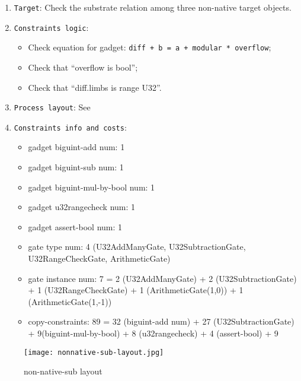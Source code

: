 
\begin{enumerate}
    \item \verb|Target|: Check the substrate relation among three non-native target objects.
    \item \verb|Constraints logic|:
    \begin{itemize}
        \item Check equation for gadget: \verb|diff + b = a + modular * overflow|;
        \item Check that ``overflow is bool'';
        \item Check that ``diff.limbs is range U32''.
    \end{itemize}
    \item \verb|Process layout|: See 
    \item \verb|Constraints info and costs|:
    \begin{itemize}
        \item gadget biguint-add num: 1
        \item gadget biguint-sub num: 1
        \item gadget biguint-mul-by-bool num: 1
        \item gadget u32rangecheck num: 1
        \item gadget assert-bool num: 1
        \item gate type num: 4 (U32AddManyGate, U32SubtractionGate, U32RangeCheckGate, ArithmeticGate)
        \item gate instance num: 7 = 2 (U32AddManyGate) + 2 (U32SubtractionGate) + 1 (U32RangeCheckGate) + 1 (ArithmeticGate(1,0)) + 1 (ArithmeticGate(1,-1))
        \item copy-constraints: 89 = 32 (biguint-add num) + 27 (U32SubtractionGate) + 9(biguint-mul-by-bool) + 8 (u32rangecheck) + 4 (assert-bool) + 9
    \end{itemize}
\end{enumerate}

\begin{figure}[!ht]
    \centering
    \texttt{[image: nonnative-sub-layout.jpg]}
    \caption{non-native-sub layout}
    \label{fig:non-native-sub-layout}
\end{figure}
